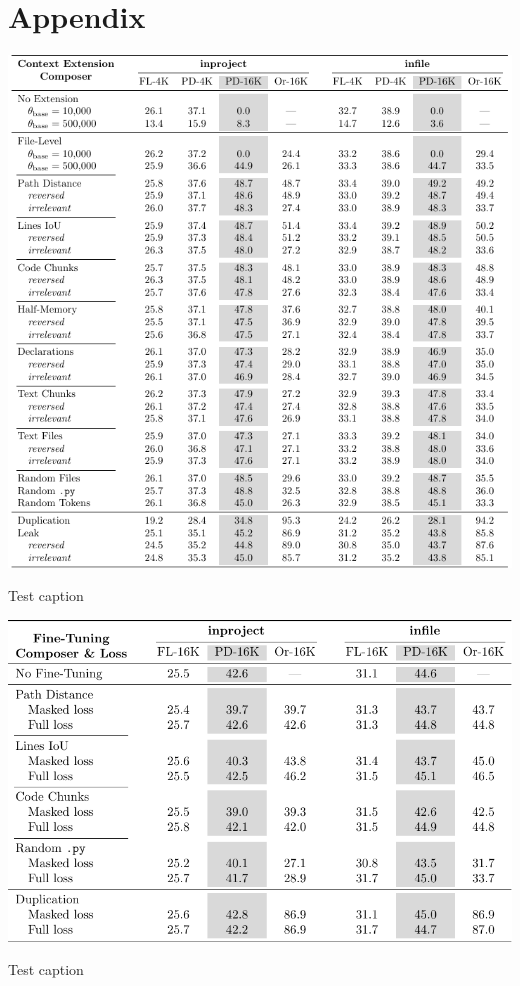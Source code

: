 \chapter{Appendix}

\begin{table}[htbp]
    \centering
    \includegraphics[width=\textwidth]{tables/rq_b.pdf}
    \caption{Test caption}\label{tab:ocoder-extension-extended}
\end{table}

\begin{table}[htbp]
    \centering
    \includegraphics[width=\textwidth]{tables/rq_a2_gradient_masking.pdf}
    \caption{Test caption}\label{tab:dseek-gradient-masking}
\end{table}

